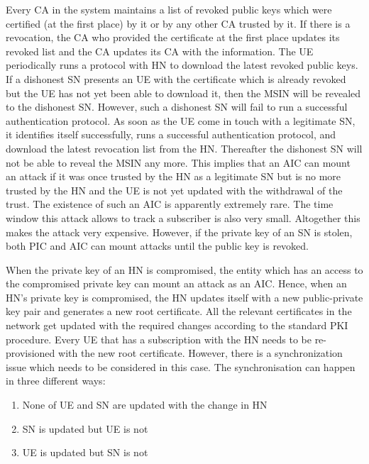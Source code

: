 \documentclass[lnicst,sechang,a4paper]{svmultln}
\begin{document}
Every CA in the system maintains a list of revoked public keys which were certified (at the first place) by it or by any other CA trusted by it. If there is a revocation, the CA who provided the certificate at the first place updates its revoked list and the CA updates its CA with the information. The UE periodically runs a protocol with HN to download the latest revoked public keys. If a dishonest SN presents an UE with the certificate which is already revoked but the UE has not yet been able to download it, then the MSIN will be revealed to the dishonest SN. However, such a dishonest SN will fail to run a successful authentication protocol. As soon as the UE come in touch with a legitimate SN, it identifies itself successfully, runs a successful authentication protocol, and download the latest revocation list from the HN. Thereafter the dishonest SN will not be able to reveal the MSIN any more. This implies that an AIC can mount an attack if it was once trusted by the HN as a legitimate SN but is no more trusted by the HN and the UE is not yet updated with the withdrawal of the trust. The existence of such an AIC is apparently extremely rare. The time window this attack allows to track a subscriber is also very small. Altogether this makes the attack very expensive. However, if the private key of an SN is stolen, both PIC and AIC can mount attacks until the public key is revoked. 

When the private key of an HN is compromised, the entity which has an access to the compromised private key can mount an attack as an AIC. Hence, when an HN's private key is compromised, the HN updates itself with a new public-private key pair and generates a new root certificate. All the relevant certificates in the network get updated with the required changes according to the standard PKI procedure. Every UE that has a subscription with the HN needs to be re-provisioned with the new root certificate. However, there is a synchronization issue which needs to be considered in this case. The synchronisation can happen in three different ways: 

\begin{enumerate}
\item None of UE and SN are updated with the change in HN
\item SN is updated but UE is not
\item UE is updated but SN is not
\end{enumerate} 
\end{document}
